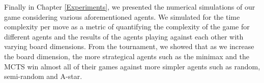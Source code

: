 Finally in Chapter \ref{Experiments}, we presented the numerical simulations of our game considering various aforementioned agents. We simulated for the time complexity per move as a metric of quantifying the complexity of the game for different agents and the results of the agents playing against each other with varying board dimensions. From the tournament, we showed that as we increase the board dimension, the more strategical agents such as the minimax and the MCTS win almost all of their games against more simpler agents such as random, semi-random and A-star.
